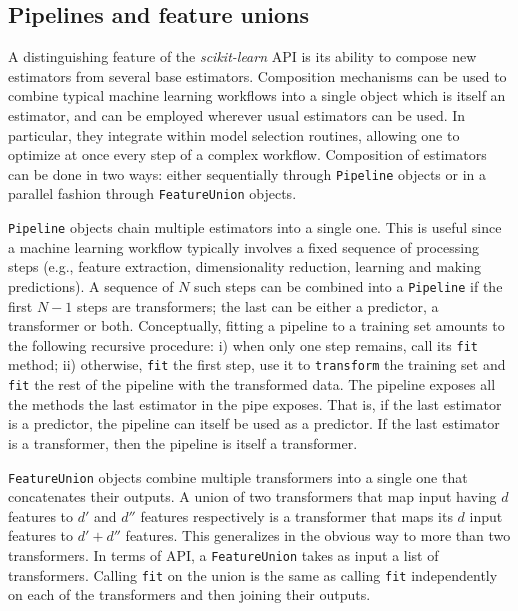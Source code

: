 \documentclass{llncs}
\newcommand{\sklearn}{\textit{scikit-learn}\xspace}
\begin{document}

\subsection{Pipelines and feature unions}

A distinguishing feature of the \sklearn API is its ability to
compose new estimators from several base estimators. Composition mechanisms can
be used to combine typical machine learning workflows into a single object which
is itself an estimator, and can be employed wherever usual estimators can be used.
In particular,
they integrate within model selection routines, allowing one to optimize at once
every step of a complex workflow. Composition of estimators can be done in two
ways: either sequentially through \texttt{Pipeline} objects or in a parallel
fashion through \texttt{FeatureUnion} objects.

\texttt{Pipeline} objects chain multiple estimators into a single one. This is
useful since a machine learning workflow typically involves a fixed sequence of
processing steps (e.g., feature extraction, dimensionality reduction, learning
and making predictions). A sequence of $N$ such steps can be combined into a
\texttt{Pipeline} if the first $N-1$ steps are transformers; the last can be
either a predictor, a transformer or both. Conceptually, fitting a pipeline to
a training set amounts to the following recursive procedure: i) when only one
step remains, call its \texttt{fit} method; ii) otherwise, \texttt{fit} the
first step, use it to \texttt{transform} the training set and \texttt{fit} the
rest of the pipeline with the transformed data. The pipeline exposes all the
methods the last estimator in the pipe exposes. That is, if the last estimator
is a predictor, the pipeline can itself be used as a predictor. If the last
estimator is a transformer, then the pipeline is itself a transformer.

\texttt{FeatureUnion} objects combine multiple transformers into a single one
that concatenates their outputs. A union of two transformers that
map input having $d$ features to $d'$ and $d''$ features respectively is
a transformer that maps its $d$ input features to $d' + d''$ features.
This generalizes in the obvious way to more than two transformers.
In terms of API, a \texttt{FeatureUnion} takes as input a list of transformers.
Calling \texttt{fit} on the union is the same as calling \texttt{fit}
independently on each of the transformers and then joining their outputs.
\end{document}

